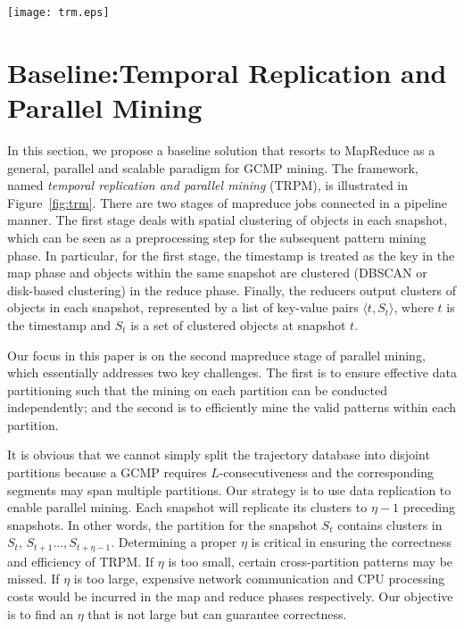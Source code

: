\begin{figure*} [t]
\center
\texttt{[image: trm.eps]}
\caption{Workflow of Temporal Replication and Parallel Mining (TRPM). (a) and (b) correspond to the first mapreduce stage which clusters objects in each snapshot.  (c) and (d) is the second mapreduce stage which uses TRPM to detect GCMPs.}
\label{fig:trm}
\end{figure*}

\section{Baseline:Temporal Replication and Parallel Mining}
\label{sec:trm}
In this section, we propose a baseline solution that resorts to MapReduce as a general, parallel and scalable paradigm for GCMP mining. The framework, named \textit{temporal replication and parallel mining} (TRPM), is illustrated in   Figure~\ref{fig:trm}. There are two stages of mapreduce jobs connected in a pipeline manner. The first stage deals with spatial clustering of objects in each snapshot, which can be seen as a preprocessing step for the subsequent pattern mining phase. In particular, for the first stage, the timestamp is treated as the key in the map phase and objects within the same snapshot are clustered (DBSCAN or disk-based clustering) in the reduce phase. Finally, the reducers output clusters of objects in each snapshot, represented by a list of key-value pairs $\langle t, S_t  \rangle$, where $t$ is the timestamp and $S_t$ is a set of clustered objects at snapshot $t$. 

Our focus in this paper is on the second mapreduce stage of parallel mining, which essentially addresses two key challenges. The first is to ensure effective data partitioning such that the mining on each partition can be conducted independently; and the second is to efficiently mine the valid patterns within each partition. 

It is obvious that we cannot simply split the trajectory database 
into disjoint partitions because a GCMP requires $L$-consecutiveness 
and the corresponding segments may span multiple partitions. 
Our strategy is to use data replication to enable parallel mining. 
Each snapshot will replicate its clusters to $\eta-1$ preceding snapshots.
In other words, the partition for the snapshot $S_t$ contains clusters 
in $S_t$, $S_{t+1}\ldots,S_{t+\eta-1}$. 
Determining a proper $\eta$ is critical in ensuring the
correctness and efficiency of TRPM. If $\eta$ is too small, 
certain cross-partition patterns may be missed. 
If $\eta$ is too large, expensive network communication and 
CPU processing costs would be incurred in the map and reduce phases respectively. Our objective is to find an $\eta$ that is not large but can guarantee correctness.


